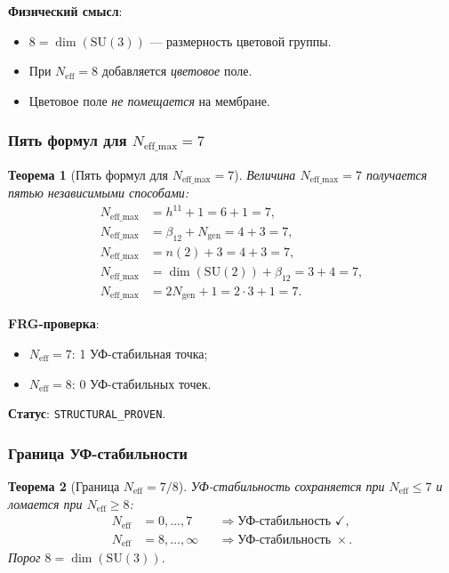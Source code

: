 \documentclass[11pt,a4paper]{article}
\newcommand{\SU}{\ensuremath{\mathrm{SU}}}
\newtheorem{theorem}{Теорема}[section]
\theoremstyle{definition}
\begin{document}
\medskip\noindent
\textbf{Физический смысл}:
\begin{itemize}
    \item $8 = \dim(\SU(3))$ --- размерность цветовой группы.
    \item При $N_{\text{eff}} = 8$ добавляется \emph{цветовое} поле.
    \item Цветовое поле \emph{не помещается} на мембране.
\end{itemize}


\subsubsection{Пять формул для $N_{\text{eff\_max}} = 7$}

\begin{theorem}[Пять формул для $N_{\text{eff\_max}} = 7$]
\label{thm:five-formulas-7}
Величина $N_{\text{eff\_max}} = 7$ получается пятью независимыми способами:
\begin{align}
    N_{\text{eff\_max}} &= h^{11} + 1 = 6 + 1 = 7, \\
    N_{\text{eff\_max}} &= \beta_{12} + N_{\text{gen}} = 4 + 3 = 7, \\
    N_{\text{eff\_max}} &= n(2) + 3 = 4 + 3 = 7, \\
    N_{\text{eff\_max}} &= \dim(\SU(2)) + \beta_{12} = 3 + 4 = 7, \\
    N_{\text{eff\_max}} &= 2 N_{\text{gen}} + 1 = 2 \cdot 3 + 1 = 7.
\end{align}
\end{theorem}

\noindent
\textbf{FRG-проверка}:
\begin{itemize}
    \item $N_{\text{eff}} = 7$: 1 УФ-стабильная точка;
    \item $N_{\text{eff}} = 8$: 0 УФ-стабильных точек.
\end{itemize}

\noindent
\textbf{Статус}: \texttt{STRUCTURAL\_PROVEN}.

\subsubsection{Граница УФ-стабильности}

\begin{theorem}[Граница $N_{\text{eff}} = 7/8$]
\label{thm:frg-boundary}
УФ-стабильность сохраняется при $N_{\text{eff}} \le 7$ и
ломается при $N_{\text{eff}} \ge 8$:
\begin{equation}
    \boxed{
    \begin{aligned}
        N_{\text{eff}} &= 0, \ldots, 7 &&\Rightarrow \text{УФ-стабильность } \checkmark, \\
        N_{\text{eff}} &= 8, \ldots, \infty &&\Rightarrow \text{УФ-стабильность } \times.
    \end{aligned}}
    \label{eq:frg-boundary}
\end{equation}
Порог $8 = \dim(\SU(3))$.
\end{theorem}
\end{document}
